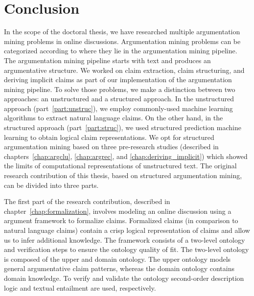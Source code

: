 \chapter{Conclusion}
\label{chap:conclusion}

In the scope of the doctoral thesis, we have researched multiple argumentation
mining problems in online discussions.  Argumentation mining
problems can be categorized according to where they lie in the argumentation
mining pipeline. The argumentation mining pipeline starts with text and
produces an argumentative structure. 
We worked on claim extraction, claim
structuring, and deriving implicit claims as part of our implementation of the
argumentation mining pipeline. To solve those problems, we make a distinction
between two approaches: an unstructured and a structured approach. In the
unstructured approach (part~\ref{part:unstruc}), we employ commonly-used machine
learning algorithms to extract natural language claims. On the other hand, in
the structured approach (part~\ref{part:struc}), we used structured prediction
machine learning to obtain logical claim representations. 
We opt for structured argumentation mining based on three pre-research studies
(described in chapters~\ref{chap:argclu}, \ref{chap:argrec}, and
\ref{chap:deriving_implicit}) which showed the limits of computational
representations of unstructured text.  
The original research contribution of this thesis, based on 
structured argumentation mining, can be divided into three parts. 

The first part of the research contribution, described in
chapter~\ref{chap:formalization}, involves modeling an online discussion using a
argument framework to formalize claims.  
Formalized claims (in comparison to natural language claims) contain a crisp
logical representation of claims and allow us to infer additional knowledge. 
The framework consists of a two-level
ontology and verification steps to ensure the ontology quality of fit.  The
two-level ontology is composed of the upper and domain ontology.  The upper
ontology models general argumentative claim patterns, whereas the domain
ontology contains domain knowledge. To verify and validate the ontology
second-order description logic and textual entailment are used, respectively. 

